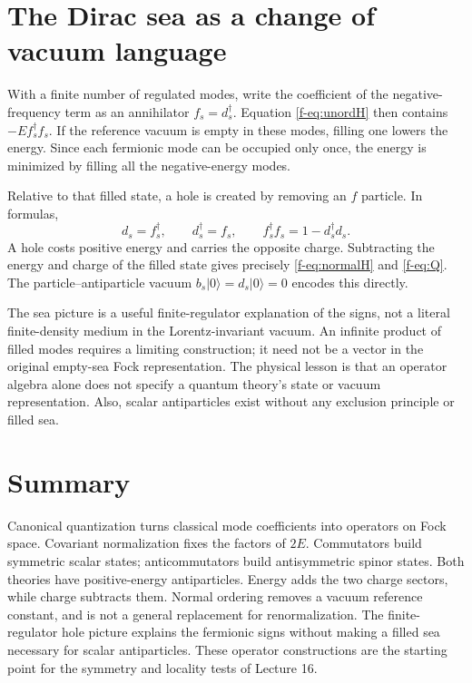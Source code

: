 \documentclass[11pt]{article}
\newcommand{\vac}{\lvert0\rangle}
\begin{document}
\section{The Dirac sea as a change of vacuum language}
With a finite number of regulated modes, write the coefficient of the
negative-frequency term as an annihilator \(f_s=d_s^\dagger\). Equation
\eqref{f-eq:unordH} then contains \(-E f_s^\dagger f_s\). If the reference
vacuum is empty in these modes, filling one lowers the energy. Since each
fermionic mode can be occupied only once, the energy is minimized by
filling all the negative-energy modes.

Relative to that filled state, a hole is created by removing an \(f\)
particle. In formulas,
\begin{equation}
 d_s=f_s^\dagger,\qquad d_s^\dagger=f_s,\qquad
 f_s^\dagger f_s=1-d_s^\dagger d_s.
 \label{f-eq:holes}
\end{equation}
A hole costs positive energy and carries the opposite charge. Subtracting
the energy and charge of the filled state gives precisely
\eqref{f-eq:normalH} and \eqref{f-eq:Q}. The particle--antiparticle vacuum
\(b_s\vac=d_s\vac=0\) encodes this directly.

The sea picture is a useful finite-regulator explanation of the signs,
not a literal finite-density medium in the Lorentz-invariant vacuum.
An infinite product of filled modes requires a limiting construction;
it need not be a vector in the original empty-sea Fock representation.
The physical lesson is that an operator algebra alone does not specify
a quantum theory's state or vacuum representation. Also, scalar
antiparticles exist without any exclusion principle or filled sea.

\section*{Summary}
Canonical quantization turns classical mode coefficients into operators on
Fock space. Covariant normalization fixes the factors of \(2E\).
Commutators build symmetric scalar states; anticommutators build
antisymmetric spinor states. Both theories have positive-energy
antiparticles. Energy adds the two charge sectors, while charge subtracts
them. Normal ordering removes a vacuum reference constant, and is not a
general replacement for renormalization. The finite-regulator hole picture
explains the fermionic signs without making a filled sea necessary for
scalar antiparticles. These operator constructions are the starting point
for the symmetry and locality tests of Lecture 16.
\end{document}
